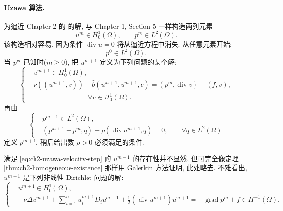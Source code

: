 \paragraph{Uzawa 算法.}
为逼近 Chapter 2 的  的解, 与 Chapter 1, Section 5 一样构造两列元素
\begin{equation}
u^m\in H_0^1(\Omega),
\qquad p^m\in L^2(\Omega).
\label{eq:ch2-uzawa-sequences}
\end{equation}
该构造相对容易, 因为条件 $\operatorname{div}u=0$ 将从逼近方程中消失. 从任意元素开始:
\begin{equation}
p^0\in L^2(\Omega).
\label{eq:ch2-uzawa-initial-pressure}
\end{equation}
当 $p^m$ 已知时($m\geq0$), 把 $u^{m+1}$ 定义为下列问题的某个解:
\begin{equation}
\left\{
\begin{aligned}
&u^{m+1}\in H_0^1(\Omega),\\
&\nu((u^{m+1},v))+\widehat b(u^{m+1},u^{m+1},v)
=(p^m,\operatorname{div}v)+(f,v),\\
&\hspace{8em}\forall v\in H_0^1(\Omega).
\end{aligned}
\right.
\label{eq:ch2-uzawa-velocity-step}
\end{equation}
再由
\begin{equation}
\left\{
\begin{aligned}
&p^{m+1}\in L^2(\Omega),\\
&(p^{m+1}-p^m,q)+\rho(\operatorname{div}u^{m+1},q)=0,
\qquad\forall q\in L^2(\Omega)
\end{aligned}
\right.
\label{eq:ch2-uzawa-pressure-step}
\end{equation}
定义 $p^{m+1}$. 稍后给出数 $\rho>0$ 必须满足的条件.

满足 \eqref{eq:ch2-uzawa-velocity-step} 的 $u^{m+1}$ 的存在性并不显然, 但可完全像定理 \ref{thm:ch2-homogeneous-existence} 那样用 Galerkin 方法证明, 此处略去. 不难看出, $u^{m+1}$ 是下列非线性 Dirichlet 问题的解:
\begin{equation}
\left\{
\begin{aligned}
&u^{m+1}\in H_0^1(\Omega),\\
&-\nu\Delta u^{m+1}
+\sum_{i=1}^{n}u_i^{m+1}D_iu^{m+1}
+\frac12(\operatorname{div}u^{m+1})u^{m+1}
=-\operatorname{grad}p^m+f\in H^{-1}(\Omega).
\end{aligned}
\right.
\label{eq:ch2-uzawa-dirichlet-problem}
\end{equation}

